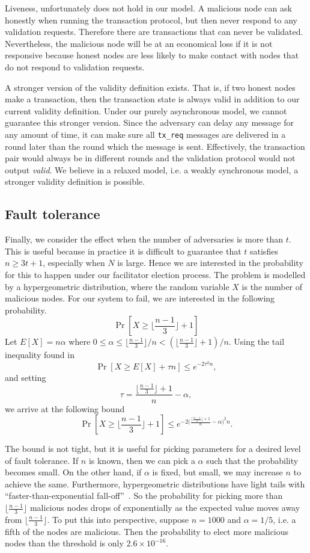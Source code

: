 Liveness, unfortunately does not hold in our model.
A malicious node can ask honestly when running the transaction protocol,
but then never respond to any validation requests.
Therefore there are transactions that can never be validated.
Nevertheless, the malicious node will be at an economical loss if it is not responsive because honest nodes are less likely to make contact with nodes that do not respond to validation requests.

A stronger version of the validity definition exists.
That is, if two honest nodes make a transaction,
then the transaction state is always valid in addition to our current validity definition.
Under our purely asynchronous model, we cannot guarantee this stronger version.
Since the adversary can delay any message for any amount of time,
it can make sure all \texttt{tx\_req} messages are delivered in a round later than the round which the message is sent.
Effectively, the transaction pair would always be in different rounds and the validation protocol would not output \emph{valid}.
We believe in a relaxed model, i.e. a weakly synchronous model, a stronger validity definition is possible.

\subsection{Fault tolerance}
Finally, we consider the effect when the number of adversaries is more than $t$.
This is useful because in practice it is difficult to guarantee that $t$ satisfies $n \ge 3t + 1$,
especially when $N$ is large.
Hence we are interested in the probability for this to happen under our facilitator election process.
The problem is modelled by a hypergeometric distribution,
where the random variable $X$ is the number of malicious nodes.
For our system to fail, we are interested in the following probability.
$$
\Pr[X \ge \lfloor \frac{n-1}{3} \rfloor + 1]
$$
Let $E[X] = n\alpha$ where $0 \le \alpha \le \lfloor \frac{n-1}{3} \rfloor/n < (\lfloor  \frac{n - 1}{3} \rfloor + 1) / n$.
Using the tail inequality found in~\cite{skala2013hypergeometric}
$$
\Pr[X \ge E[X] + \tau n] \le e^{-2\tau^2n},
$$
and setting 
$$
\tau = \frac{\lfloor \frac{n-1}{3} \rfloor + 1}{n} - \alpha,
$$
we arrive at the following bound
$$
\Pr[X \ge \lfloor \frac{n-1}{3} \rfloor + 1] \le e^{-2 \big(\frac{\lfloor  \frac{n - 1}{3} \rfloor + 1}{n} - \alpha \big)^2 n}.
$$

The bound is not tight, but it is useful for picking parameters for a desired level of fault tolerance.
If $n$ is known, then we can pick a $\alpha$ such that the probability becomes small.
On the other hand, if $\alpha$ is fixed, but small, we may increase $n$ to achieve the same.
Furthermore, hypergeometric distributions have light tails with ``faster-than-exponential fall-off''~\cite{skala2013hypergeometric}.
So the probability for picking more than $\lfloor \frac{n-1}{3} \rfloor$ malicious nodes drops of exponentially as the expected value moves away from $\lfloor \frac{n-1}{3} \rfloor$.
To put this into perspective,
suppose $n = 1000$ and $\alpha = 1/5$, i.e. a fifth of the nodes are malicious.
Then the probability to elect more malicious nodes than the threshold is only $2.6 \times 10^{-16}$.




